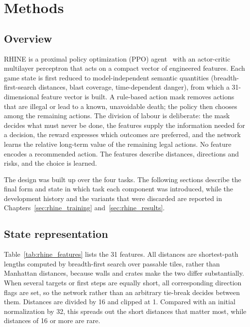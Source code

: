 \documentclass[11pt,a4paper]{report}
\begin{document}
	\chapter{Methods}
	\label{chap:methods}
	\label{sec:rhine_methods}
	
	\section{Overview}
	\label{subsec:rhine_methods_overview}
	
	RHINE is a proximal policy optimization (PPO) agent~\cite{schulman2017ppo} with an actor-critic multilayer perceptron that acts on a compact vector of engineered features. Each game state is first reduced to model-independent semantic quantities (breadth-first-search distances, blast coverage, time-dependent danger), from which a 31-dimensional feature vector is built. A rule-based action mask removes actions that are illegal or lead to a known, unavoidable death; the policy then chooses among the remaining actions. The division of labour is deliberate: the mask decides what must never be done, the features supply the information needed for a decision, the reward expresses which outcomes are preferred, and the network learns the relative long-term value of the remaining legal actions. No feature encodes a recommended action. The features describe distances, directions and risks, and the choice is learned.
	
	The design was built up over the four tasks. The following sections describe the final form and state in which task each component was introduced, while the development history and the variants that were discarded are reported in Chapters~\ref{sec:rhine_training} and~\ref{sec:rhine_results}.
	
	\section{State representation}
	\label{subsec:rhine_features}
	
	Table~\ref{tab:rhine_features} lists the 31 features. All distances are shortest-path lengths computed by breadth-first search over passable tiles, rather than Manhattan distances, because walls and crates make the two differ substantially. When several targets or first steps are equally short, all corresponding direction flags are set, so the network rather than an arbitrary tie-break decides between them. Distances are divided by 16 and clipped at 1. Compared with an initial normalization by 32, this spreads out the short distances that matter most, while distances of 16 or more are rare.
	
\end{document}
